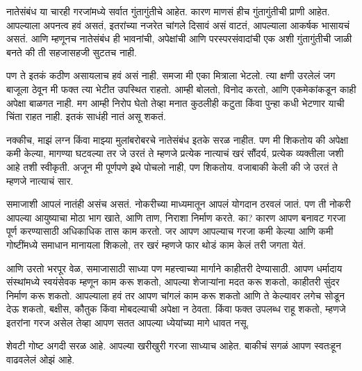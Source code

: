 नातेसंबंध या चारही गरजांमध्ये सर्वात गुंतागुंतीचे आहेत. कारण माणसं हीच गुंतागुंतीची प्राणी आहेत. आपल्याला अपनत्व हवं असतं, इतरांच्या नजरेत चांगले दिसावं असं वाटतं, आपल्याला आकर्षक भासायचं असतं. आणि म्हणूनच नातेसंबंध ही भावनांची, अपेक्षांची आणि परस्परसंवादांची एक अशी गुंतागुंतीची जाळी बनते की ती सहजासहजी सुटतच नाही.

पण ते इतकं कठीण असायलाच हवं असं नाही. समजा मी एका मित्राला भेटलो. त्या क्षणी उरलेलं जग बाजूला ठेवून मी फक्त त्या भेटीत उपस्थित राहतो. आम्ही बोलतो, विनोद करतो, आणि एकमेकांकडून काही अपेक्षा बाळगत नाही. मग आम्ही निरोप घेतो तेव्हा मनात कुठलीही कटुता किंवा पुन्हा कधी भेटणार याची चिंता राहत नाही. इतकं साधंही नातं असू शकतं.

नक्कीच, माझं लग्न किंवा माझ्या मुलांबरोबरचे नातेसंबंध इतके सरळ नाहीत. पण मी शिकतोय की अपेक्षा कमी केल्या, मागण्या घटवल्या तर जे उरतं ते म्हणजे प्रत्येक नात्याचं खरं सौंदर्य,  प्रत्येक व्यक्तीला जशी आहे तशी स्वीकृती. अजून मी पूर्णपणे इथे पोचलो नाही, पण शिकतोय. वजाबाकी केली की जे उरतं ते म्हणजे नात्याचं सार.

समाजाशी आपलं नातंही असंच असतं. नोकरीच्या माध्यमातून आपलं योगदान ठरवलं जातं. पण ती नोकरी आपल्या आयुष्याचा मोठा भाग खाते, आणि ताण, निराशा निर्माण करते. का? कारण आपण बनावट गरजा पूर्ण करण्यासाठी अधिकाधिक तास काम करतो. जर आपण आपल्याच गरजा कमी केल्या आणि कमी गोष्टींमध्ये समाधान मानायला शिकलो, तर खरं म्हणजे फार थोडं काम केलं तरी जगता येतं.

आणि उरतो भरपूर वेळ,  समाजासाठी साध्या पण महत्त्वाच्या मार्गाने काहीतरी देण्यासाठी. आपण धर्मादाय संस्थांमध्ये स्वयंसेवक म्हणून काम करू शकतो, आपल्या शेजाऱ्यांना मदत करू शकतो, काहीतरी सुंदर निर्माण करू शकतो. आपल्याला हवं तर आपण चांगलं काम करू शकतो आणि ते केल्यावर लगेच सोडून देऊ शकतो,  बक्षीस, कौतुक किंवा मोबदल्याची अपेक्षा न ठेवता. किंवा फक्त उपलब्ध राहू शकतो, म्हणजे इतरांना गरज असेल तेव्हा आपण सतत आपल्या ध्येयांच्या मागे धावत नसू.

शेवटी गोष्ट अगदी सरळ आहे. आपल्या खरीखुरी गरजा साध्याच आहेत. बाकीचं सगळं आपण स्वतःहून वाढवलेलं ओझं आहे.
